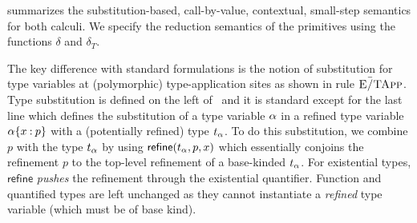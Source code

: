  summarizes the substitution-based, 
call-by-value, contextual, small-step semantics 
for both calculi.
%
We specify the reduction semantics 
of the primitives using the functions 
$\delta$ and $\delta_T$.

%
The key difference with standard formulations
is the notion of substitution for type variables 
at (polymorphic) type-application sites as shown 
in rule $\textsc{E\=/TApp}$.
%
Type 
substitution is defined on the left of~
and it is standard except 
for the last line which defines the substitution 
of a type variable $\alpha$ in a refined type variable 
${{{\alpha}\{x \mathbin{:} p\}}}$ with a 
(potentially refined)
type $t_\alpha$.
%
To do this substitution, we combine $p$ with the type $t_\alpha$ 
by using $\mathsf{refine}(t_\alpha, p, x)$ 
which essentially conjoins the refinement $p$ 
to the top-level refinement of a base-kinded 
$t_\alpha$. 
%
For existential types, $\mathsf{refine}$ 
\emph{pushes} the refinement through the 
existential quantifier. 
%
Function and quantified types are left unchanged 
as they cannot instantiate a \emph{refined} 
type variable (which must be of base kind).



